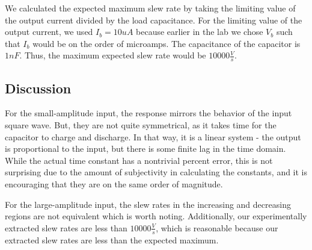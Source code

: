 \documentclass{article}
\begin{document}
We calculated the expected maximum slew rate by taking the limiting value of the output current divided by the load capacitance. For the limiting value of the output current, we used $I_b = 10uA$ because earlier in the lab we chose $V_b$ such that $I_b$ would be on the order of microamps. The capacitance of the capacitor is $1nF$. Thus, the maximum expected slew rate would be $10000 \frac{V}{s}$.

\subsection{Discussion}
For the small-amplitude input, the response mirrors the behavior of the input square wave. But, they are not quite symmetrical, as it takes time for the capacitor to charge and discharge. In that way, it is a linear system - the output is proportional to the input, but there is some finite lag in the time domain. While the actual time constant has a nontrivial percent error, this is not surprising due to the amount of subjectivity in calculating the constants, and it is encouraging that they are on the same order of magnitude.  

For the large-amplitude input, the slew rates in the increasing and decreasing regions are not equivalent which is worth noting. Additionally, our experimentally extracted slew rates are less than $10000 \frac{V}{s}$, which is reasonable because our extracted slew rates are less than the expected maximum.
\end{document}
